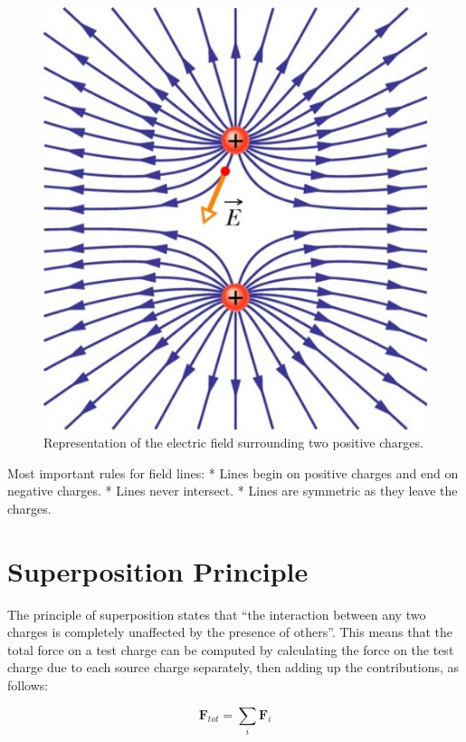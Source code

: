 \documentclass[
  letterpaper,
  DIV=11,
  numbers=noendperiod]{scrreprt}
\begin{document}
\begin{figure}[H]

{\centering \includegraphics{Figures/Efield_like.png}

}

\caption{Representation of the electric field surrounding two positive
charges.}

\end{figure}%

Most important rules for field lines: * Lines begin on positive charges
and end on negative charges. * Lines never intersect. * Lines are
symmetric as they leave the charges.

\section{Superposition Principle}\label{superposition-principle}

The principle of superposition states that ``the interaction between any
two charges is completely unaffected by the presence of others''. This
means that the total force on a test charge can be computed by
calculating the force on the test charge due to each source charge
separately, then adding up the contributions, as follows:

\[ \mathrm{\mathbf{F}}_{tot} = \sum_i \mathrm{\mathbf{F}}_i \]
\end{document}
